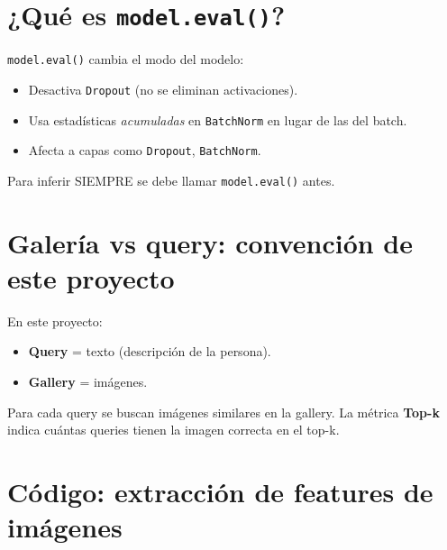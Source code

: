 \section{¿Qué es \texttt{model.eval()}?}

\texttt{model.eval()} cambia el modo del modelo:

\begin{itemize}
  \item Desactiva \texttt{Dropout} (no se eliminan activaciones).
  \item Usa estadísticas \emph{acumuladas} en \texttt{BatchNorm}
        en lugar de las del batch.
  \item Afecta a capas como \texttt{Dropout}, \texttt{BatchNorm}.
\end{itemize}

\noindent Para inferir SIEMPRE se debe llamar
\texttt{model.eval()} antes.

\section{Galería vs query: convención de este proyecto}

En este proyecto:

\begin{itemize}
  \item \textbf{Query} = texto (descripción de la persona).
  \item \textbf{Gallery} = imágenes.
\end{itemize}

\noindent Para cada query se buscan imágenes similares en la
gallery. La métrica \textbf{Top-k} indica cuántas queries
tienen la imagen correcta en el top-k.

\section{Código: extracción de features de imágenes}

